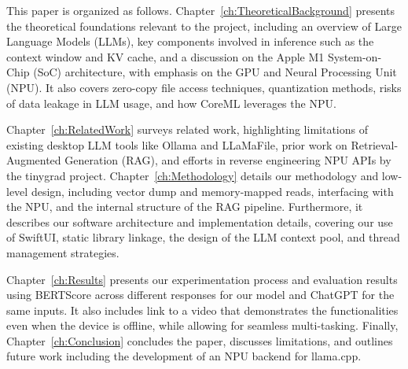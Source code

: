 This paper is organized as follows. Chapter~\ref{ch:TheoreticalBackground} presents the theoretical foundations relevant to the project, including an overview of Large Language Models (LLMs), key components involved in inference such as the context window and KV cache, and a discussion on the Apple M1 System-on-Chip (SoC) architecture, with emphasis on the GPU and Neural Processing Unit (NPU). It also covers zero-copy file access techniques, quantization methods, risks of data leakage in LLM usage, and how CoreML leverages the NPU.

Chapter~\ref{ch:RelatedWork} surveys related work, highlighting limitations of existing desktop LLM tools like Ollama and LLaMaFile, prior work on Retrieval-Augmented Generation (RAG), and efforts in reverse engineering NPU APIs by the tinygrad project. Chapter~\ref{ch:Methodology} details our methodology and low-level design, including vector dump and memory-mapped reads, interfacing with the NPU, and the internal structure of the RAG pipeline. Furthermore, it describes our software architecture and implementation details, covering our use of SwiftUI, static library linkage, the design of the LLM context pool, and thread management strategies. 

Chapter~\ref{ch:Results} presents our experimentation process and evaluation results using BERTScore across different responses for our model and ChatGPT for the same inputs. It also includes link to a video that demonstrates the functionalities even when the device is offline, while allowing for seamless multi-tasking. Finally, Chapter~\ref{ch:Conclusion} concludes the paper, discusses limitations, and outlines future work including the development of an NPU backend for llama.cpp.